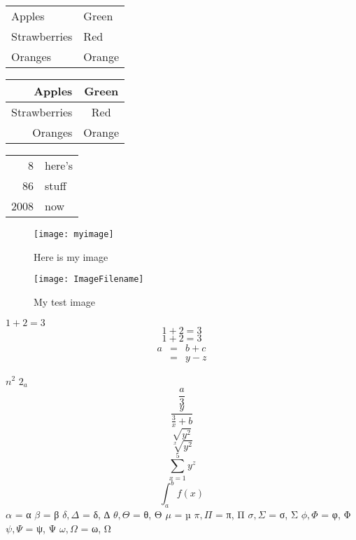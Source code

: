 \documentclass[a4paper,12pt]{article}
\begin{document}
\begin{tabular}{|l|l|}
Apples & Green \\
Strawberries & Red \\
Oranges & Orange \\
\end{tabular}
\begin{tabular}{rc}
Apples & Green \\
\hline
Strawberries & Red \\
\cline{1-1}
Oranges & Orange \\
\end{tabular}
\begin{tabular}{|r|l|}
\hline
8 & here’s \\
\cline{2-2}
86 & stuff \\
\hline \hline
2008 & now \\
\hline
\end{tabular}

\begin{figure}[h]
\centering
\texttt{[image: myimage]}
\caption{Here is my image}
\label{image-myimage}
\end{figure}

\begin{figure}[h!]
\centering
\texttt{[image: ImageFilename]}
\caption{My test image}
\end{figure}

$1+2=3$
$$1+2=3$$
\begin{equation}1+2=3\end{equation}
\begin{eqnarray}
  a & = & b + c \\
    & = & y - z
\end{eqnarray}

$n^2$
$2_a$ 
$$\frac{a}{3}$$
$$\frac{y}{\frac{3}{x}+b}$$
$$\sqrt{y^2}$$
$$\sqrt[x]{y^2}$$
$$\sum_{x=1}^5 y^z$$
$$\int_a^b f(x)$$
$\alpha$ = α
$\beta$ = β
$\delta, \Delta$ = δ, ∆
$\theta, \Theta$ = θ, Θ
$\mu$ = µ
$\pi, \Pi$ = π, Π
$\sigma, \Sigma$ = σ, Σ
$\phi, \Phi$ = φ, Φ
$\psi, \Psi$ = ψ, Ψ
$\omega, \Omega$ = ω, Ω

\begin{comment}
This is a comments.
\end{comment}
\end{document}
